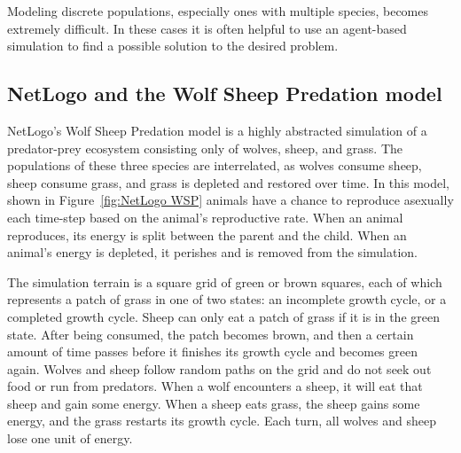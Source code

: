     Modeling discrete populations, especially ones with multiple species,
    becomes extremely difficult.
    In these cases it is often helpful to use an agent-based simulation
    to find a possible solution to the desired problem.


\subsection{NetLogo and the Wolf Sheep Predation model}\label{subsec:netlogo-wsp}
    NetLogo's Wolf Sheep Predation model is a highly abstracted simulation of a
    predator-prey ecosystem consisting only of wolves, sheep, and grass.
    The populations of these three species are interrelated, as wolves consume sheep,
    sheep consume grass, and grass is depleted and restored over time.
    In this model, shown in Figure~\ref{fig:NetLogo WSP} animals have a chance to
    reproduce asexually each time-step based on the animal's reproductive rate.
    When an animal reproduces, its energy is split between the parent and the child.
    When an animal's energy is depleted, it perishes and is removed from the simulation.

    The simulation terrain is a square grid of green or brown squares,
    each of which represents a patch of grass in one of two states:
    an incomplete growth cycle, or a completed growth cycle.
    Sheep can only eat a patch of grass if it is in the green state.
    After being consumed, the patch becomes brown, and then a certain amount
    of time passes before it finishes its growth cycle and becomes green again.
    Wolves and sheep follow random paths on the grid and do not seek out food or
    run from predators.
    When a wolf encounters a sheep, it will eat that sheep and gain some energy.
    When a sheep eats grass, the sheep gains some energy, and the grass restarts
    its growth cycle.
    Each turn, all wolves and sheep lose one unit of energy.